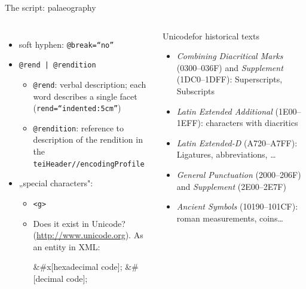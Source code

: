 \begin{frame}[fragile]{The script: palaeography}

\begin{columns}
\begin{itemize}
\item  soft hyphen: \texttt{@break=“no”}
\item  \texttt{@rend | @rendition}
\begin{itemize}
    \item \texttt{@rend}: verbal description; each word describes a single facet (\texttt{rend=“indented:5cm”})
    \item \texttt{@rendition}: reference to description of the rendition in the \texttt{teiHeader//encodingProfile}
\end{itemize}
\item  „special characters":
\begin{itemize}
    \item \texttt{<g>}
    \item Does it exist in Unicode? (\protect\url{http://www.unicode.org}). As an entity in XML:
\begin{xmlcode}
&#x[hexadecimal code];
&#[decimal code];
\end{xmlcode}
\end{itemize}
\end{itemize}

\begin{block}{Unicodefor historical texts}\scriptsize
\begin{itemize}
\item  \emph{Combining Diacritical Marks} (0300–036F) and \emph{Supplement} (1DC0–1DFF): Superscripts, Subscripts
\item  \emph{Latin Extended Additional} (1E00–1EFF): characters with diacritics
\item  \emph{Latin Extended-D} (A720–A7FF): Ligatures, abbreviations, \dots
\item  \emph{General Punctuation} (2000–206F) and \emph{Supplement} (2E00–2E7F)%
\item  \emph{Ancient Symbols} (10190–101CF): roman measurements, coins\dots
\end{itemize}
\end{block}
\end{columns}


\end{frame}
